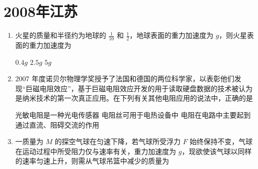 \documentclass[\gkver]{gaokaozhenti}
\begin{document}
\chapter{2008年江苏}

\begin{enumerate}
\item
火星的质量和半径约为地球的 $\frac{1}{10}$ 和 $\frac{1}{2}$，地球表面的重力加速度为 $g$，则火星表面的重力加速度为

{$0.4g$}
{$2.5g$}
{$5g$}


\item
2007 年度诺贝尔物理学奖授予了法国和德国的两位科学家，以表彰他们发现“巨磁电阻效应”，基于巨磁电阻效应开发的用于读取硬盘数据的技术被认为是纳米技术的第一次真正应用。在下列有关其他电阻应用的说法中，正确的是

{光敏电阻是一种光电传感器}
{电阻丝可用于电热设备中}
{电阻在电路中主要起到通过直流、阻碍交流的作用}


\item
一质量为 $M$ 的探空气球在匀速下降，若气球所受浮力 $F$ 始终保持不变，气球在运动过程中所受阻力仅与速率有关，重力加速度为 $g$，现欲使该气球以同样的速率匀速上升，则需从气球吊篮中减少的质量为


\end{enumerate}
\end{document}
